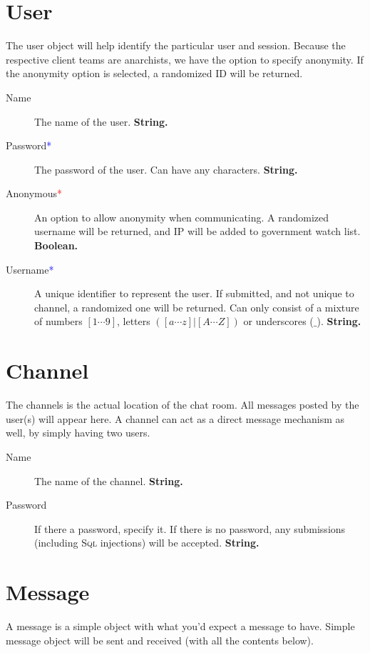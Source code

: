 \documentclass[12pt]{scrartcl}
\newcommand{\req}{\textcolor{red}{*}}
\newcommand{\reqalt}{\textcolor{blue}{*}}
\begin{document}
\section{User}\label{sec:user}
The user object will help identify the particular user and session. Because the respective client teams are anarchists, we have the option to specify anonymity. If the anonymity option is selected, a randomized ID will be returned.

\begin{description}
    \item[Name] The name of the user. \textbf{String.}
    \item[Password\reqalt] The password of the user. Can have any characters. \textbf{String.}
    \item[Anonymous\req] An option to allow anonymity when communicating. A randomized username will be returned, and IP will be added to government watch list. \textbf{Boolean.}
    \item[Username\reqalt] A unique identifier to represent the user. If submitted, and not unique to channel, a randomized one will be returned. Can only consist of a mixture of numbers $[1 \cdots 9]$, letters $([a \cdots z] | [A \cdots Z])$ or underscores ($\_$). \textbf{String.}
\end{description}


\section{Channel}\label{sec:channel}
The channels is the actual location of the chat room. All messages posted by the user(s) will appear here. A channel can act as a direct message mechanism as well, by simply having two users.

\begin{description}
    \item[Name] The name of the channel. \textbf{String.}
    \item[Password] If there a password, specify it. If there is no password, any submissions (including \textsc{Sql} injections) will be accepted. \textbf{String.}
\end{description}


\section{Message}
A message is a simple object with what you'd expect a message to have. Simple message object will be sent and received (with all the contents below).
\end{document}
